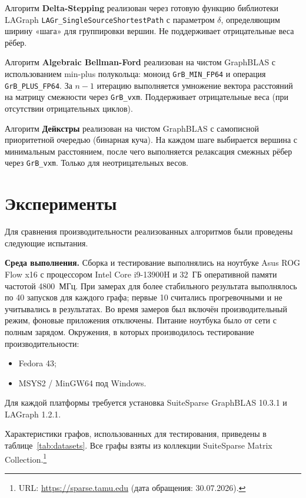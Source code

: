 \documentclass[a4paper]{article}
\begin{document}
Алгоритм \textbf{Delta-Stepping} реализован через готовую функцию библиотеки LAGraph
\texttt{LAGr\_SingleSourceShortestPath} с параметром $\delta$, определяющим ширину
«шага» для группировки вершин. Не поддерживает отрицательные веса рёбер.

Алгоритм \textbf{Algebraic Bellman-Ford} реализован на чистом GraphBLAS с
использованием min-plus полукольца: моноид \texttt{GrB\_MIN\_FP64} и операция
\texttt{GrB\_PLUS\_FP64}. За $n-1$ итерацию выполняется умножение вектора расстояний
на матрицу смежности через \texttt{GrB\_vxm}. Поддерживает отрицательные веса
(при отсутствии отрицательных циклов).

Алгоритм \textbf{Дейкстры} реализован на чистом GraphBLAS с самописной приоритетной
очередью (бинарная куча). На каждом шаге выбирается вершина с минимальным расстоянием,
после чего выполняется релаксация смежных рёбер через \texttt{GrB\_vxm}.
Только для неотрицательных весов.

\section{Эксперименты}

Для сравнения производительности реализованных алгоритмов были проведены следующие испытания.

\textbf{Среда выполнения.} 
Сборка и тестирование выполнялись на ноутбуке Asus ROG Flow x16 с процессором Intel Core i9-13900H и 32~ГБ оперативной памяти частотой 4800~МГц. 
При замерах для более стабильного результата выполнялось по 40 запусков для каждого графа; первые 10 считались прогревочными и не учитывались в результатах. Во время замеров был включён производительный режим, фоновые приложения отключены. Питание ноутбука было от сети с полным зарядом.
Окружения, в которых производилось тестирование производительности:
\begin{itemize}
    \item Fedora 43;
    \item MSYS2 / MinGW64 под Windows.
\end{itemize}


Для каждой платформы требуется установка SuiteSparse GraphBLAS 10.3.1 и LAGraph 1.2.1.

Характеристики графов, использованных для тестирования, приведены в
таблице~\ref{tab:datasets}. Все графы взяты из коллекции SuiteSparse Matrix
Collection.\footnote{URL: \url{https://sparse.tamu.edu} (дата обращения: 30.07.2026).}
\end{document}

